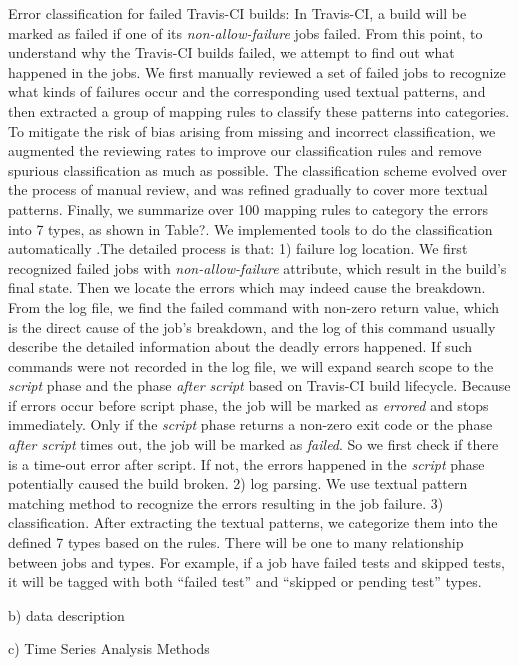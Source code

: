 Error classification for failed Travis-CI builds: 
In Travis-CI, a build will be marked as failed if one of its \textit{non-allow-failure} jobs failed. From this point, to understand why the Travis-CI builds failed, we attempt to find out what happened in the jobs. We first manually reviewed a set of failed jobs to recognize what kinds of failures occur and the corresponding used textual patterns, and then extracted a group of mapping rules to classify these patterns into categories. To mitigate the risk of bias arising from missing and incorrect classification, we augmented the reviewing rates to improve our classification rules and remove spurious classification as much as possible. The classification scheme evolved over the process of manual review, and was refined gradually to cover more textual patterns. Finally, we summarize over 100 mapping rules to category the errors into 7 types, as shown in Table?. 
We implemented tools to do the classification automatically .The detailed process is that: 1) failure log location. We first recognized failed jobs with \textit{non-allow-failure} attribute, which result in the build's final state. Then we locate the errors which may indeed cause the breakdown. From the log file, we find the failed command with non-zero return value, which is the direct cause of the job’s breakdown, and the log of this command usually describe the detailed information about the deadly errors happened. If such commands were not recorded in the log file, we will expand search scope to the \textit{script} phase and the phase \textit{after script} based on Travis-CI build lifecycle. Because if errors occur before script phase, the job will be marked as \textit{errored} and stops immediately. Only if the \textit{script} phase returns a non-zero exit code or the phase \textit{after script} times out, the job will be marked as \textit{failed}. So we first check if there is a time-out error after script. If not, the errors happened in the \textit{script} phase potentially caused the build broken. 2) log parsing. We use textual pattern matching method to recognize the errors resulting in the job failure. 3) classification. After extracting the textual patterns, we categorize them  into the defined 7 types based on the rules. There will be one to many relationship between jobs and types. For example, if a job have failed tests and skipped tests, it will be tagged with both “failed test” and “skipped or pending test” types.


b) data description

c) Time Series Analysis Methods

